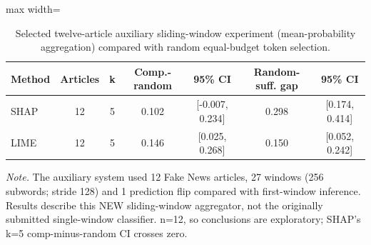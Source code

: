 \begin{table}[t]
\centering
\caption{Selected twelve-article auxiliary sliding-window experiment (mean-probability aggregation) compared with random equal-budget token selection.}
\label{tab:optionb}
\footnotesize
\begin{adjustbox}{max width=\linewidth}
\begin{tabular}{lcccccc}
\toprule
Method & Articles & k & Comp.-random & 95\% CI & Random-suff. gap & 95\% CI \\
\midrule
SHAP & 12 & 5 & 0.102 & [-0.007, 0.234] & 0.298 & [0.174, 0.414] \\
LIME & 12 & 5 & 0.146 & [0.025, 0.268] & 0.150 & [0.052, 0.242] \\
\bottomrule
\end{tabular}
\end{adjustbox}
\par\vspace{2pt}
\begin{minipage}{\linewidth}
\scriptsize\emph{Note.} The auxiliary system used 12 Fake News articles, 27 windows (256 subwords; stride 128) and 1 prediction flip compared with first-window inference. Results describe this NEW sliding-window aggregator, not the originally submitted single-window classifier. n=12, so conclusions are exploratory; SHAP's k=5 comp-minus-random CI crosses zero.
\end{minipage}
\end{table}

